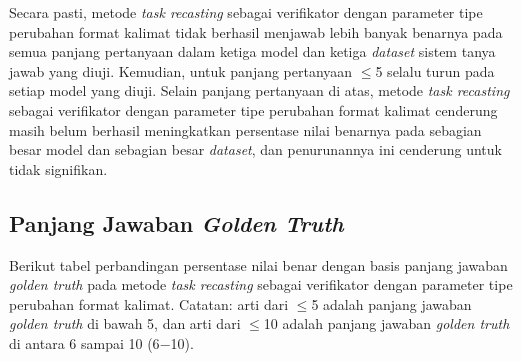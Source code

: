 Secara pasti, metode \emph{task recasting} sebagai verifikator dengan parameter tipe perubahan format kalimat tidak berhasil menjawab lebih banyak benarnya pada semua panjang pertanyaan dalam ketiga model dan ketiga \emph{dataset} sistem tanya jawab yang diuji. Kemudian, untuk panjang pertanyaan $\leq$5 selalu turun pada setiap model yang diuji. Selain panjang pertanyaan di atas, metode \emph{task recasting} sebagai verifikator dengan parameter tipe perubahan format kalimat cenderung masih belum berhasil meningkatkan persentase nilai benarnya pada sebagian besar model dan sebagian besar \emph{dataset}, dan penurunannya ini cenderung untuk tidak signifikan.

\subsection{Panjang Jawaban \emph{Golden Truth}}
Berikut tabel perbandingan persentase nilai benar dengan basis panjang jawaban \emph{golden truth} pada metode \emph{task recasting} sebagai verifikator dengan parameter tipe perubahan format kalimat. Catatan: arti dari $\leq$5 adalah panjang jawaban \emph{golden truth} di bawah 5, dan arti dari $\leq$10 adalah panjang jawaban \emph{golden truth} di antara 6 sampai 10 (6$-$10).

